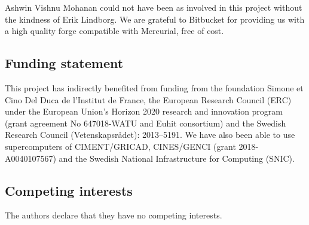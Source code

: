 
Ashwin Vishnu Mohanan could not have been as involved in this project without the
kindness of Erik Lindborg.
%
We are grateful to Bitbucket for providing us with a high quality forge
compatible with Mercurial, free of cost.

\subsection*{Funding statement}


This project has indirectly benefited from funding from the foundation Simone et
Cino Del Duca de l'Institut de France, the European Research Council (ERC)
under the European Union's Horizon 2020 research and innovation program (grant
agreement No 647018-WATU and Euhit consortium) and the Swedish Research Council
(Vetenskapsr{\aa}det): 2013--5191.
%
We have also been able to use supercomputers of CIMENT/GRICAD, CINES/GENCI
(grant 2018-A0040107567) and the Swedish National Infrastructure for Computing
(SNIC).

\subsection*{Competing interests}


The authors declare that they have no competing interests.



